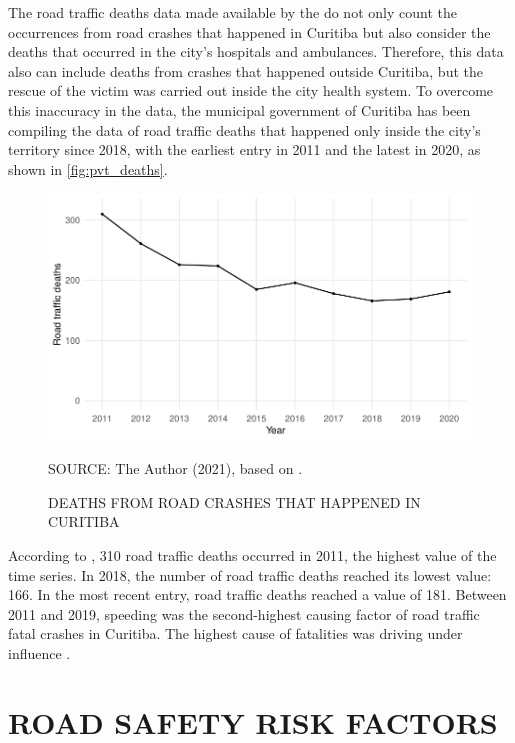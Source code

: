 The road traffic deaths data made available by the \textcite{MinistryofHealth2020} do not only count the occurrences from road crashes that happened in Curitiba but also consider the deaths that occurred in the city's hospitals and ambulances. Therefore, this data also can include deaths from crashes that happened outside Curitiba, but the rescue of the victim was carried out inside the city health system. To overcome this inaccuracy in the data, the municipal government of Curitiba has been compiling the data of road traffic deaths that happened only inside the city's territory since 2018, with the earliest entry in 2011 and the latest in 2020, as shown in \autoref{fig:pvt_deaths}.  

\begin{figure}[!htbp]
    \centering\footnotesize
    \captionsetup{font=footnotesize}
    \caption{DEATHS FROM ROAD CRASHES THAT HAPPENED IN CURITIBA}
    \includegraphics{fig/pvt_plot.pdf}
    \label{fig:pvt_deaths}
    \par SOURCE: The Author (2021), based on \textcite{Curitiba2021}.
\end{figure} 

According to \textcite{Curitiba2021}, 310 road traffic deaths occurred in 2011, the highest value of the time series. In 2018, the number of road traffic deaths reached its lowest value: 166. In the most recent entry, road traffic deaths reached a value of 181. Between 2011 and 2019, speeding was the second-highest causing factor of road traffic fatal crashes in Curitiba. The highest cause of fatalities was driving under influence \cite{Curitiba2020}. 

\section{ROAD SAFETY RISK FACTORS} \label{sec:risk}

